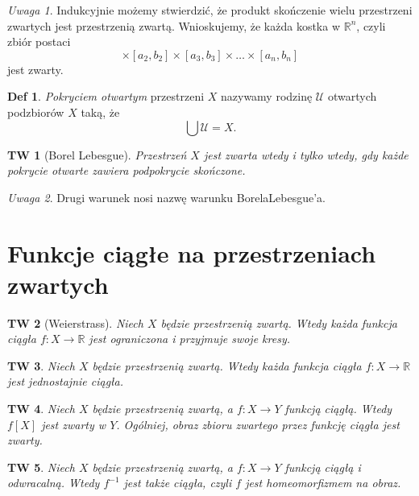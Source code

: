 \documentclass[a4paper, 12pt]{mwart}
\theoremstyle{definition}
\newtheorem{definicja}{Def}[section]
\theoremstyle{plain}
\newtheorem{twierdzenie}{TW}[section]
\theoremstyle{remark}
\newtheorem*{uwaga}{Uwaga}
\begin{document}
\begin{uwaga}
	Indukcyjnie możemy stwierdzić, że produkt skończenie wielu przestrzeni zwartych jest przestrzenią zwartą. Wnioskujemy, że każda kostka w $\mathbb{R}^n$, czyli zbiór postaci
	\begin{equation}
		[a_1, b_1] \times [a_2, b_2] \times [a_3, b_3] \times \ldots \times [a_n, b_n]
	\end{equation}
	jest zwarty.
\end{uwaga}
\begin{definicja}
	\emph{Pokryciem otwartym} przestrzeni $X$ nazywamy rodzinę $\mathcal{U}$ otwartych podzbiorów $X$ taką, że
	\begin{equation}
		\bigcup \mathcal{U} = X.
	\end{equation}
\end{definicja}
\begin{twierdzenie}[Borel \ppauza Lebesgue]
	Przestrzeń $X$ jest zwarta wtedy i tylko wtedy, gdy każde pokrycie otwarte zawiera podpokrycie skończone.
\end{twierdzenie}
\begin{uwaga}
	Drugi warunek nosi nazwę warunku Borela\dywiz Lebesgue'a.
\end{uwaga}
\section{Funkcje ciągłe na przestrzeniach zwartych}
\begin{twierdzenie}[Weierstrass]
	Niech $X$ będzie przestrzenią zwartą. Wtedy każda funkcja ciągła $f\colon X \to \mathbb{R}$ jest ograniczona i przyjmuje swoje kresy.
\end{twierdzenie}
\begin{twierdzenie}
	Niech $X$ będzie przestrzenią zwartą. Wtedy każda funkcja ciągła $f\colon X \to \mathbb{R}$ jest jednostajnie ciągła.
\end{twierdzenie}
\begin{twierdzenie}
	Niech $X$ będzie przestrzenią zwartą, a $f\colon X \to Y$ funkcją ciągłą. Wtedy $f[X]$ jest zwarty w $Y$. Ogólniej, obraz zbioru zwartego przez funkcję ciągła jest zwarty.
\end{twierdzenie}
\begin{twierdzenie}
	Niech $X$ będzie przestrzenią zwartą, a $f\colon X \to Y$ funkcją ciągłą i odwracalną. Wtedy $f^{-1}$ jest także ciągła, czyli $f$ jest homeomorfizmem na obraz.
\end{twierdzenie}
\end{document}
